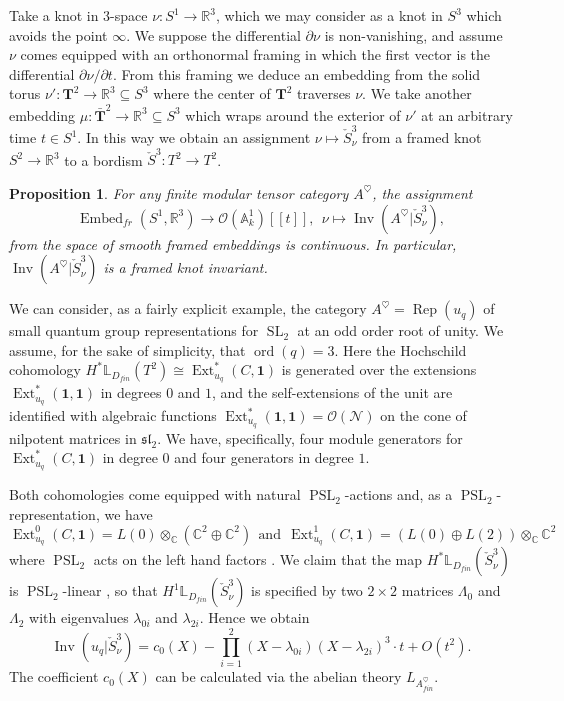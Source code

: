 \documentclass[reqno]{amsart}
\newtheorem{proposition}[lemma]{Proposition}
\theoremstyle{definition}
\newcommand{\mfk}[1]{\mathfrak{#1}}
\newcommand{\mbb}[1]{\mathbb{#1}}
\newcommand{\mcl}[1]{\mathcal{#1}}
\newcommand{\mbf}[1]{\mathbf{#1}}
\newcommand{\opn}[1]{\operatorname{#1}}
\DeclareMathOperator{\Ext}{Ext}
\DeclareMathOperator{\Rep}{Rep}
\renewcommand{\1}{\mathbf{1}}
\begin{document}
Take a knot in $3$-space $\nu:S^1\to \mbb{R}^3$, which we may consider as a knot in $S^3$ which avoids the point $\infty$. We suppose the differential $\partial\nu$ is non-vanishing, and assume $\nu$ comes equipped with an orthonormal framing in which the first vector is the differential $\partial\nu/\partial t$. From this framing we deduce an embedding from the solid torus $\nu':\mbf{T}^2\to \mbb{R}^3\subseteq S^3$ where the center of $\mbf{T}^2$ traverses $\nu$. We take another embedding $\mu:\bar{\mbf{T}}^2\to \mbb{R}^3\subseteq S^3$ which wraps around the exterior of $\nu'$ at an arbitrary time $t\in S^1$.  In this way we obtain an assignment $\nu\mapsto \check{S}^3_\nu$ from a framed knot $S^2\to \mbb{R}^3$ to a bordism $\check{S}^3:T^2\to T^2$.

\begin{proposition}\label{prop:inv_knots}
For any finite modular tensor category $A^{\heartsuit}$, the assignment
\[
\opn{Embed}_{fr}(S^1,\mbb{R}^3)\to \mcl{O}(\mbb{A}^1_k)[\![t]\!],\ \ \nu\mapsto \opn{Inv}\left(A^{\heartsuit}|\check{S}^3_\nu\right),
\]
from the space of smooth framed embeddings is continuous.  In particular, $\opn{Inv}\left(A^{\heartsuit}|\check{S}^3_\nu\right)$ is a framed knot invariant.
\end{proposition}

We can consider, as a fairly explicit example, the category $A^{\heartsuit}=\Rep(u_q)$ of small quantum group representations for $\opn{SL}_2$ at an odd order root of unity. We assume, for the sake of simplicity, that $\opn{ord}(q)=3$. Here the Hochschild cohomology $H^{\ast}\mbb{L}_{D_{fin}}(T^2)\cong \Ext^{\ast}_{u_q}(C,\1)$ is generated over the extensions $\Ext^{\ast}_{u_q}(\1,\1)$ in degrees $0$ and $1$, and the self-extensions of the unit are identified with algebraic functions $\Ext^{\ast}_{u_q}(\1,\1)=\mcl{O}(\mcl{N})$ on the cone of nilpotent matrices in $\mfk{sl}_2$.  We have, specifically, four module generators for $\Ext^{\ast}_{u_q}(C,\1)$ in degree $0$ and four generators in degree $1$.
\par

Both cohomologies come equipped with natural $\opn{PSL}_2$-actions and, as a $\opn{PSL}_2$-representation, we have
\begin{equation}\label{eq:5248}
\Ext^{0}_{u_q}(C,\1)=L(0)\otimes_{\mbb{C}}(\mbb{C}^2\oplus \mbb{C}^2)\ \ \text{and}\ \ \Ext^{1}_{u_q}(C,\1)=(L(0)\oplus L(2))\otimes_{\mbb{C}}\mbb{C}^2
\end{equation}
where $\opn{PSL}_2$ acts on the left hand factors \cite[Section 5]{lachowskaqi21}. We claim that the map $H^{\ast}\mbb{L}_{D_{fin}}(\check{S}^3_{\nu})$ is $\opn{PSL}_2$-linear \cite{sajan}, so that $H^1\mbb{L}_{D_{fin}}(\check{S}^3_{\nu})$ is specified by two $2\times 2$ matrices $\Lambda_0$ and $\Lambda_2$ with eigenvalues $\lambda_{0i}$ and $\lambda_{2i}$. Hence we obtain
\[
\opn{Inv}(u_q|\check{S}^3_{\nu})=c_0(X)-\prod_{i=1}^2(X-\lambda_{0i})(X-\lambda_{2i})^3\cdot t+O(t^2).
\] 
The coefficient $c_0(X)$ can be calculated via the abelian theory $L_{A^{\heartsuit}_{fin}}$.
\end{document}
